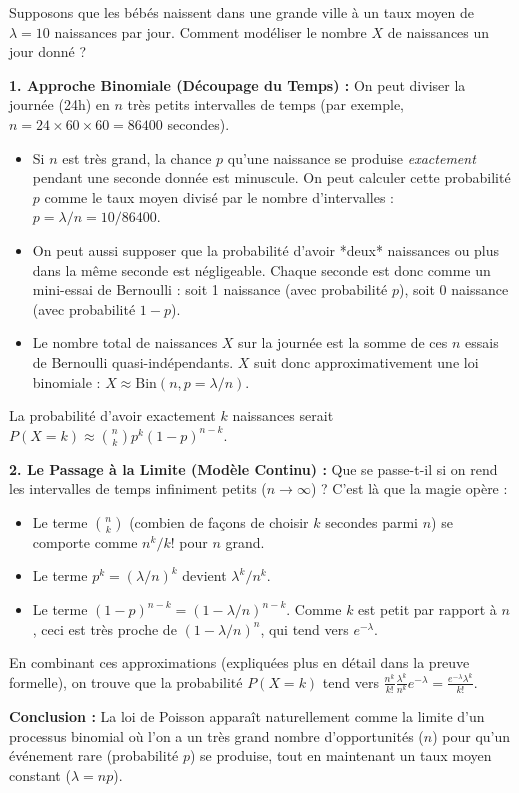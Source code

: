 \begin{intuitionbox}
Supposons que les bébés naissent dans une grande ville à un taux moyen de $\lambda=10$ naissances par jour. Comment modéliser le nombre $X$ de naissances un jour donné ?

\textbf{1. Approche Binomiale (Découpage du Temps) :}
On peut diviser la journée (24h) en $n$ très petits intervalles de temps (par exemple, $n = 24 \times 60 \times 60 = 86400$ secondes).
\begin{itemize}
    \item Si $n$ est très grand, la chance $p$ qu'une naissance se produise \textit{exactement} pendant une seconde donnée est minuscule. On peut calculer cette probabilité $p$ comme le taux moyen divisé par le nombre d'intervalles : $p = \lambda / n = 10 / 86400$.
    \item On peut aussi supposer que la probabilité d'avoir *deux* naissances ou plus dans la même seconde est négligeable. Chaque seconde est donc comme un mini-essai de Bernoulli : soit 1 naissance (avec probabilité $p$), soit 0 naissance (avec probabilité $1-p$).
    \item Le nombre total de naissances $X$ sur la journée est la somme de ces $n$ essais de Bernoulli quasi-indépendants. $X$ suit donc approximativement une loi binomiale : $X \approx \text{Bin}(n, p=\lambda/n)$.
\end{itemize}
La probabilité d'avoir exactement $k$ naissances serait $P(X=k) \approx \binom{n}{k} p^k (1-p)^{n-k}$.

\textbf{2. Le Passage à la Limite (Modèle Continu) :}
Que se passe-t-il si on rend les intervalles de temps infiniment petits ($n \to \infty$) ? C'est là que la magie opère :
\begin{itemize}
    \item Le terme $\binom{n}{k}$ (combien de façons de choisir $k$ secondes parmi $n$) se comporte comme $n^k/k!$ pour $n$ grand.
    \item Le terme $p^k = (\lambda/n)^k$ devient $\lambda^k / n^k$.
    \item Le terme $(1-p)^{n-k} = (1-\lambda/n)^{n-k}$. Comme $k$ est petit par rapport à $n$, ceci est très proche de $(1-\lambda/n)^n$, qui tend vers $e^{-\lambda}$.
\end{itemize}
En combinant ces approximations (expliquées plus en détail dans la preuve formelle), on trouve que la probabilité $P(X=k)$ tend vers $\frac{n^k}{k!} \frac{\lambda^k}{n^k} e^{-\lambda} = \frac{e^{-\lambda}\lambda^k}{k!}$.

\textbf{Conclusion :}
La loi de Poisson apparaît naturellement comme la limite d'un processus binomial où l'on a un très grand nombre d'opportunités ($n$) pour qu'un événement rare (probabilité $p$) se produise, tout en maintenant un taux moyen constant ($\lambda = np$).
\end{intuitionbox}

